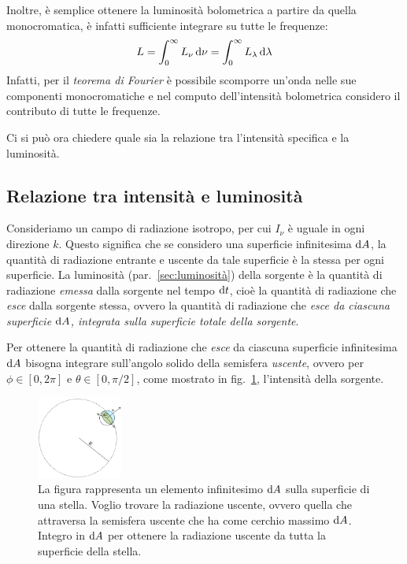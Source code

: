 Inoltre, è semplice ottenere la luminosità bolometrica a partire da quella monocromatica, è infatti sufficiente integrare su tutte le frequenze:
\begin{equation}\label{eq:luminosità-bolometrica}
    L = \int_0^\infty L_\nu \mathop{\mathrm{{}d}}\mathopen{} \nu = \int_0^\infty L_\lambda \mathop{\mathrm{{}d}}\mathopen{} \lambda
\end{equation}
Infatti, per il \emph{teorema di Fourier} è possibile scomporre un'onda nelle sue componenti monocromatiche e nel computo dell'intensità bolometrica considero il contributo di tutte le frequenze.

Ci si può ora chiedere quale sia la relazione tra l'intensità specifica e la luminosità.

\subsection{Relazione tra intensità e luminosità}\label{sec:relazione-intensità-luminosità}
Consideriamo un campo di radiazione isotropo, per cui $I_\nu$ è uguale in ogni direzione $k$. Questo significa che se considero una superficie infinitesima $\mathop{\mathrm{{}d}}\mathopen{} A$, la quantità di radiazione entrante e uscente da tale superficie è la stessa per ogni superficie. La luminosità (par.~\ref{sec:luminosità}) della sorgente è la quantità di radiazione \emph{emessa} dalla sorgente nel tempo $\mathop{\mathrm{{}d}}\mathopen{} t$, cioè la quantità di radiazione che \emph{esce} dalla sorgente stessa, ovvero la quantità di radiazione che \emph{esce da ciascuna superficie $\mathop{\mathrm{{}d}}\mathopen{} A$, integrata sulla superficie totale della sorgente}.

Per ottenere la quantità di radiazione che \emph{esce} da ciascuna superficie infinitesima $\mathop{\mathrm{{}d}}\mathopen{} A$ bisogna integrare sull'angolo solido della semisfera \emph{uscente}, ovvero per $\phi \in [0, 2\pi]$ e $\theta \in [0, \pi/2]$, come mostrato in fig.~\ref{fig:emisfera-uscente}, l'intensità della sorgente.

\begin{figure}
\centering
\includegraphics[width=0.25\textwidth]{immagini/emisfera-uscente.png}
\caption{La figura rappresenta un elemento infinitesimo $\mathop{\mathrm{{}d}}\mathopen{} A$ sulla superficie di una stella. Voglio trovare la radiazione uscente, ovvero quella che attraversa la semisfera uscente che ha come cerchio massimo $\mathop{\mathrm{{}d}}\mathopen{} A$. Integro in $\mathop{\mathrm{{}d}}\mathopen{} A$ per ottenere la radiazione uscente da tutta la superficie della stella.}
\label{fig:emisfera-uscente}
\end{figure}

